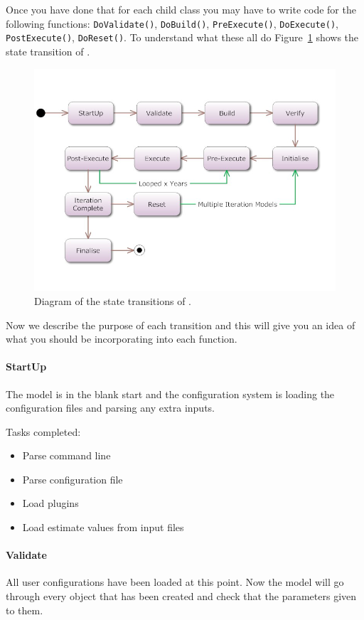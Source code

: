 Once you have done that for each child class you may have to write code for the following functions{\color{red}:} \texttt{DoValidate()}, \texttt{DoBuild()}, \texttt{PreExecute()}, \texttt{DoExecute()}, \texttt{PostExecute()}, \texttt{DoReset()}. To understand what these all do Figure~\ref{fig:flow} shows the state transition of \CNAME.

\begin{figure}[H]
	\centering
	\includegraphics[scale=0.6]{Figures/State-Transition.png}
	\caption{Diagram of the state transitions of \CNAME.}\label{fig:flow}
\end{figure}

Now we describe the purpose of each transition and this will give you an idea of what you should be incorporating into each function.

\paragraph*{StartUp}
The model is in the blank start and the configuration system is loading the configuration files and parsing any extra inputs.

Tasks completed:
\begin{itemize}
	\item Parse command line
	\item Parse configuration file
	\item Load plugins
	\item Load estimate values from input files
\end{itemize}

\paragraph*{Validate}
All user configurations have been loaded at this point. Now the model will go through every object that has been created and check that the parameters given to them.

